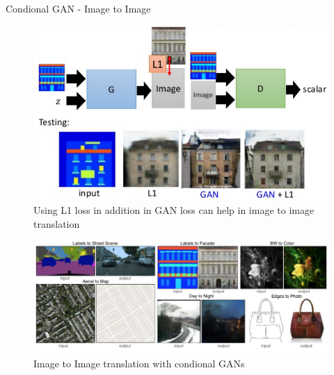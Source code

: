 \begin{frame}[allowframebreaks]{Condional GAN - Image to Image}

\begin{figure}
    \centering
    \includegraphics[height=0.75\textheight, width=\textwidth, keepaspectratio]{images/gan/cond_gan_3.png}
    \caption*{Using L1 loss in addition in GAN loss can help in image to image translation}
\end{figure}

\framebreak

\begin{figure}
    \centering
    \includegraphics[height=0.8\textheight, width=\textwidth, keepaspectratio]{images/gan/cond_gan_4.png}
    \caption*{Image to Image translation with condional GANs}
\end{figure}
    
\end{frame}